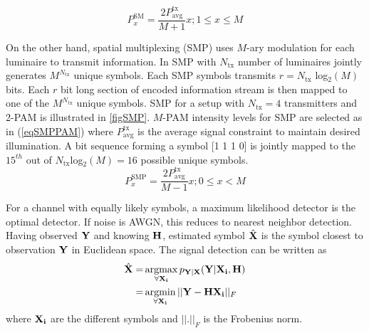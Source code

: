 \begin{equation}
	\label{eqSMPAM}
	P_{x}^{\text{SM}} = \frac{2P^{\text{tx}}_{\text{avg}}}{M+1}x; 1 \leq x \leq M
\end{equation}

On the other hand, spatial multiplexing (SMP) uses $M$-ary modulation for each luminaire to transmit information. In SMP with $N_{\text{tx}}$ number of luminaires jointly generates $M^{N_{\text{tx}}}$ unique symbols. Each SMP symbols transmits $r=N_{\text{tx}}$ log$^{ }_{2}(M)$ bits. Each $r$ bit long section of encoded information stream is then mapped to one of the $M^{N_{\text{tx}}}$ unique symbols. SMP for a setup with $N_{\text{tx}}=4$ transmitters and 2-PAM is illustrated in \figurename{ \ref{figSMP}}. $M$-PAM intensity levels for SMP are selected as in (\ref{eqSMPPAM}) where $P^{\text{tx}}_{\text{avg}}$ is the average signal constraint to maintain desired illumination. A bit sequence forming a symbol [1 1 1 0] is jointly mapped to the $15^{th}$ out of $N_{\text{tx}}$log$^{ }_{2}(M)=16$ possible unique symbols.
\begin{equation}
	\label{eqSMPPAM}
	P_{x}^{\text{SMP}} = \frac{2P^{\text{tx}}_{\text{avg}}}{M-1}x; 0\leq x < M
\end{equation}

For a channel with equally likely symbols, a maximum likelihood detector is the optimal detector. If noise is AWGN, this reduces to nearest neighbor detection. Having observed ${\bf{Y}}$ and knowing ${\bf{H}}$, estimated symbol $\hat{{\bf{X}}}$ is the symbol closest to observation ${\bf{Y}}$ in Euclidean space. The signal detection can be written as
\begin{gather}
\begin{aligned}
	\hat{{\bf{X}}} =&{} \argmax_{\forall{\bf{X_i}}} p_{{\bf{Y}}|{\bf{X}}}({\bf{Y}}|{\bf{X_i}},{\bf{H}})\\
	=&{} \argmin_{\forall{\bf{X_i}}} ||{\bf{Y}}-{\bf{H}}{\bf{X_i}}||_{F}
\label{eq:ML}
\end{aligned}
\end{gather}
where ${\bf{X_i}}$ are the different symbols and $||.||_{F}$ is the Frobenius norm.

